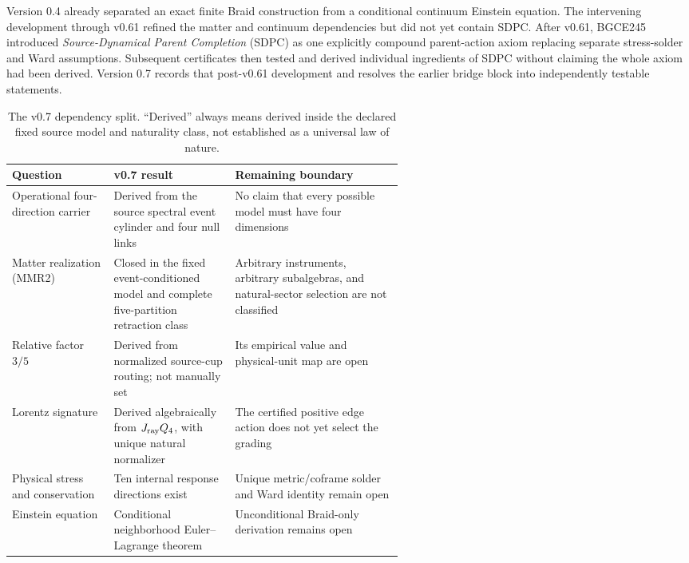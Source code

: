 \documentclass[11pt]{article}
\theoremstyle{definition}
\theoremstyle{remark}
\begin{document}
Version 0.4 already separated an exact finite Braid construction from a conditional continuum Einstein equation. The intervening development through v0.61 refined the matter and continuum dependencies but did not yet contain SDPC. After v0.61, BGCE245 introduced \emph{Source-Dynamical Parent Completion} (SDPC) as one explicitly compound parent-action axiom replacing separate stress-solder and Ward assumptions. Subsequent certificates then tested and derived individual ingredients of SDPC without claiming the whole axiom had been derived. Version 0.7 records that post-v0.61 development and resolves the earlier bridge block into independently testable statements.

\begin{table}[ht]
\centering
\small
\begin{tabularx}{\linewidth}{>{\raggedright\arraybackslash}p{0.26\linewidth} >{\raggedright\arraybackslash}p{0.31\linewidth} X}
\toprule
Question & v0.7 result & Remaining boundary \\
\midrule
Operational four-direction carrier & Derived from the source spectral event cylinder and four null links & No claim that every possible model must have four dimensions \\
Matter realization (MMR2) & Closed in the fixed event-conditioned model and complete five-partition retraction class & Arbitrary instruments, arbitrary subalgebras, and natural-sector selection are not classified \\
Relative factor $3/5$ & Derived from normalized source-cup routing; not manually set & Its empirical value and physical-unit map are open \\
Lorentz signature & Derived algebraically from $J_{\rm ray}Q_4$, with unique natural normalizer & The certified positive edge action does not yet select the grading \\
Physical stress and conservation & Ten internal response directions exist & Unique metric/coframe solder and Ward identity remain open \\
Einstein equation & Conditional neighborhood Euler--Lagrange theorem & Unconditional Braid-only derivation remains open \\
\bottomrule
\end{tabularx}
\caption{The v0.7 dependency split. ``Derived'' always means derived inside the declared fixed source model and naturality class, not established as a universal law of nature.}
\label{tab:delta}
\end{table}
\end{document}
